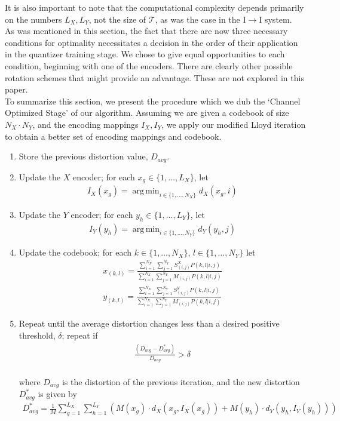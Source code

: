 \documentclass[10pt]{article}
\DeclareMathOperator*{\argmin}{arg\,min}
\begin{document}
It is also important to note that the computational complexity depends primarily on the numbers $L_X, L_Y$, not the size of $\mathcal T$, as was the case in the I$\rightarrow$I system.\\

As was mentioned in this section, the fact that there are now three necessary conditions for optimality necessitates a decision in the order of their application in the quantizer training stage. We chose to give equal opportunities to each condition, beginning with one of the encoders. There are clearly other possible rotation schemes that might provide an advantage. These are not explored in this paper.\\

To summarize this section, we present the procedure which we dub the `Channel Optimized Stage' of our algorithm. Assuming we are given a codebook of size $N_X\cdot N_Y$, and the encoding mappings $I_X, I_Y$, we apply our modified Lloyd iteration to obtain a better set of encoding mappings and codebook.\\

\begin{enumerate}
    \item Store the previous distortion value, $D_{avg}$.
    \item Update the $X$ encoder; for each $x_g\in \{1,\ldots,L_X\}$, let
    \begin{align}
        I_X(x_g)=\argmin_{i\in\{1,\ldots,N_X\}}d_X(x_g,i)
    \end{align}
    \item Update the $Y$ encoder; for each $y_h\in \{1,\ldots,L_Y\}$, let
    \begin{align}
        I_Y(y_h)=\argmin_{i\in\{1,\ldots,N_Y\}}d_Y(y_h,j)
    \end{align}
    \item Update the codebook; for each $k\in\{1,\ldots,N_X\}$, $l\in\{1,\ldots,N_Y\}$ let
    \begin{align}
        x_{(k,l)} = 
            \frac{\sum_{i=1}^{N_X} \sum_{j=1}^{N_Y}
            S_{(i,j)}^X P(k,l|i,j)}
            {\sum_{i=1}^{N_X} \sum_{j=1}^{N_Y}
            M_{(i,j)} P(k,l|i,j)}\\
        y_{(k,l)} = 
            \frac{\sum_{i=1}^{N_X} \sum_{j=1}^{N_Y}
            S_{(i,j)}^Y P(k,l|i,j)}
            {\sum_{i=1}^{N_X} \sum_{j=1}^{N_Y}
            M_{(i,j)} P(k,l|i,j)}
    \end{align}
    \item Repeat until the average distortion changes less than a desired positive threshold, $\delta$; repeat if
    \begin{align}
        \frac
        {(D_{avg} - D^*_{avg})}
        {D_{avg}}
        > \delta
    \end{align}
    \\
    where $D_{avg}$ is the distortion of the previous iteration, and the new distortion $D^*_{avg}$ is given by
    \begin{align}
        D^*_{avg}=\frac{1}{M}\sum_{g=1}^{L_X}\sum_{h=1}^{L_Y}\left(M(x_g)\cdot d_X(x_g,I_X(x_g))+M(y_h)\cdot d_Y(y_h,I_Y(y_h))\right)
    \end{align}
\end{enumerate}
\end{document}
